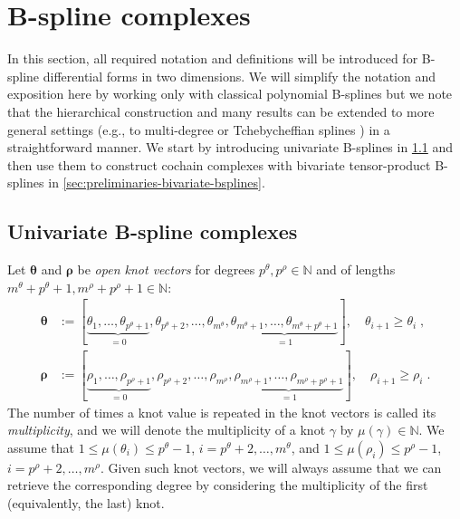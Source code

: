 \documentclass[10pt]{article}
\newcommand{\mbf}[1]{{\boldsymbol{#1}}}
\newcommand{\NN}{{\mathbb{N}}}
\newcommand{\cU}{\theta}
\newcommand{\cV}{\rho}
\newcommand{\degU}{p^\cU}
\newcommand{\degV}{p^\cV}
\newcommand{\kntU}{\cU}
\newcommand{\kntV}{\cV}
\newcommand{\kntsU}{\mbf{\kntU}}
\newcommand{\kntsV}{\mbf{\kntV}}
\newcommand{\mult}[1]{\mu(#1)}
\newcommand{\ndofU}{m^\cU}
\newcommand{\ndofV}{m^\cV}
\theoremstyle{plain}
\theoremstyle{definition}
\theoremstyle{remark}
\begin{document}
\section{B-spline complexes}\label{sec:preliminaries-bsplines}

In this section, all required notation and definitions will be introduced for
B-spline differential forms in two dimensions.
We will simplify the notation and exposition here by working only with classical polynomial B-splines but we note that the hierarchical construction and many results can be extended to more general settings (e.g., to multi-degree or Tchebycheffian splines \cite{Toshniwal:2017,Toshniwal:2020,Hiemstra:2020}) in a straightforward manner.
We start by introducing univariate B-splines in \cref{sec:preliminaries-univariate-bsplines} and then use them to construct cochain complexes with bivariate tensor-product B-splines in \cref{sec:preliminaries-bivariate-bsplines}.

\subsection{Univariate B-spline complexes}\label{sec:preliminaries-univariate-bsplines}

Let $\kntsU$ and $\kntsV$ be \emph{open knot vectors} for degrees $\degU, \degV \in\NN$ and of lengths $\ndofU+\degU+1,\ndofV+\degV+1 \in \NN$:
\begin{equation} \label{eq:knotVector}
\begin{split}
  \kntsU &:= [\underbrace{\kntU_1,\dots,\kntU_{\degU+1}}_{= 0},\kntU_{\degU+2},\dots,\kntU_{\ndofU},\underbrace{\kntU_{\ndofU+1},\dots,\kntU_{\ndofU+\degU+1}}_{= 1}],\quad 
  \kntU_{i+1} \geq \kntU_{i}\;,\\
  \kntsV &:= [\underbrace{\kntV_1,\dots,\kntV_{\degV+1}}_{= 0},\kntV_{\degV+2},\dots,\kntV_{\ndofV},\underbrace{\kntV_{\ndofV+1},\dots,\kntV_{\ndofV+\degV+1}}_{= 1}],\quad 
  \kntV_{i+1} \geq \kntV_{i}\;.
\end{split}
\end{equation}
The number of times a knot value is repeated in the knot vectors is called its \emph{multiplicity}, and we will denote the multiplicity of a knot $\gamma$ by $\mult{\gamma} \in \NN$.
We assume that $1 \leq \mult{\kntU_i} \leq \degU-1$, $i = \degU+2, \dots, \ndofU$, and $1 \leq \mult{\kntV_i} \leq \degV-1$, $i = \degV+2, \dots, \ndofV$.
Given such knot vectors, we will always assume that we can retrieve the corresponding degree by considering the multiplicity of the first (equivalently, the last) knot.
\end{document}
